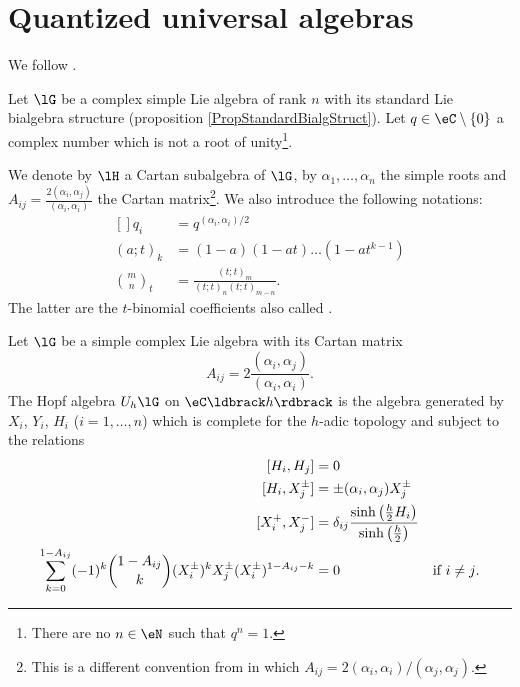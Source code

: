 \section{Quantized universal algebras}

We follow \cite{SoibelmanI}.

Let \( \lG\) be a complex simple Lie algebra of rank \( n\) with its standard Lie bialgebra structure (proposition \ref{PropStandardBialgStruct}). Let \( q\in\eC\setminus\{ 0 \}\) a complex number which is not a root of unity\footnote{There are no \( n\in\eN\) such that \( q^n=1\).}.

We denote by \( \lH\) a Cartan subalgebra of \( \lG \), by \( \alpha_1,\ldots,\alpha_n\) the simple roots and \( A_{ij}=\frac{ 2(\alpha_i,\alpha_j) }{ (\alpha_i,\alpha_i) }\) the Cartan matrix\footnote{This is a different convention from \cite{SoibelmanI} in which \( A_{ij}=2(\alpha_i,\alpha_i)/(\alpha_j,\alpha_j)\).}. We also introduce the following notations:
\begin{equation}
    \begin{aligned}[]
        q_i&=q^{(\alpha_i,\alpha_i)/2}\\
        (a;t)_k&=(1-a)(1-at)\ldots (1-at^{k-1})\\
        \binom{m}{n}_t&=\frac{ (t;t)_m }{ (t;t)_n(t;t)_{m-n} }.
    \end{aligned}
\end{equation}
The latter are the \( t\)-binomial coefficients also called .

\begin{definition}
    Let \( \lG\) be a simple complex Lie algebra with its Cartan matrix 
    \begin{equation}
        A_{ij}=2\frac{ (\alpha_i,\alpha_j) }{ (\alpha_i,\alpha_i) }.
    \end{equation}
    The Hopf algebra \( U_h\lG\) on \( \eC\ldbrack h\rdbrack \) is the algebra generated by \( X_i\), \( Y_i\), \( H_i\) (\( i=1,\ldots,n\)) which is complete for the \( h\)-adic topology and subject to the relations
    \begin{equation}
        \begin{aligned}[]
            [H_i,H_j]&=0\\
            [H_i,X^{\pm}_j]&=\pm(\alpha_i,\alpha_j)X^{\pm}_j\\
            [X_i^+,X_j^-]&=\delta_{ij}\frac{ \sinh\left( \frac{ h }{2}H_i \right) }{ \sinh\left( \frac{ h }{2} \right) }\\
            \sum_{k=0}^{1-A_{ij}}(-1)^k\binom{1-A_{ij}}{k}(X_i^{\pm})^kX_j^{\pm}(X_i^{\pm})^{1-A_{ij}-k}&=0 &   \text{if \( i\neq j\)}.
        \end{aligned}
    \end{equation}
    
\end{definition}

